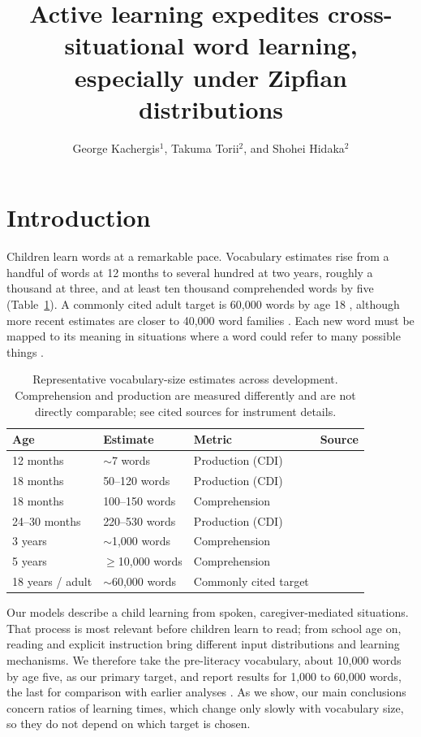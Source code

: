 \documentclass[a4paper,natbib,man]{apa6}
\title{Active learning expedites cross-situational word learning, especially under Zipfian distributions}
\author{George Kachergis$^1$, Takuma Torii$^2$, and Shohei Hidaka$^2$}
\affiliation{$^1$Department of Psychology, Stanford University, Stanford, CA, 94305, USA and $^2$School of Knowledge Science, Japan Advanced Institute of Science and Technology, Nomi, Ishikawa, 923-1292, Japan}
\begin{document}
\maketitle

\section{Introduction}

Children learn words at a remarkable pace. Vocabulary estimates rise from a handful of words at 12 months to several hundred at two years, roughly a thousand at three, and at least ten thousand comprehended words by five (Table~\ref{tab-vocab-benchmarks}). A commonly cited adult target is 60,000 words by age 18 \citep{Bloom:2000}, although more recent estimates are closer to 40,000 word families \citep{Brysbaert:2016}. Each new word must be mapped to its meaning in situations where a word could refer to many possible things \citep[cf.][]{Blythe:2016}.

\begin{table}[h]
\centering
\caption{\label{tab-vocab-benchmarks} Representative vocabulary-size estimates across development. Comprehension and production are measured differently and are not directly comparable; see cited sources for instrument details.}
\small
\begin{tabular}{@{}p{2.2cm}p{2.2cm}p{3.0cm}p{5.5cm}@{}}
\hline
Age & Estimate & Metric & Source \\
\hline
12 months & $\sim$7 words & Production (CDI) & \citep{Frank:2017} \\
18 months & 50--120 words & Production (CDI) & \citep{Frank:2017} \\
18 months & 100--150 words & Comprehension & \citep{Hulit:2002} \\
24--30 months & 220--530 words & Production (CDI) & \citep{Frank:2017} \\
3 years & $\sim$1,000 words & Comprehension & \citep{Hart:1995} \\
5 years & $\geq$10,000 words & Comprehension & \citep{Shipley:2015} \\
18 years / adult & $\sim$60,000 words & Commonly cited target & \citep{Bloom:2000} \\
\hline
\end{tabular}
\end{table}

Our models describe a child learning from spoken, caregiver-mediated situations. That process is most relevant before children learn to read; from school age on, reading and explicit instruction bring different input distributions and learning mechanisms. We therefore take the pre-literacy vocabulary, about 10,000 words by age five, as our primary target, and report results for 1,000 to 60,000 words, the last for comparison with earlier analyses \citep{Blythe:2010,Vogt:2012}. As we show, our main conclusions concern ratios of learning times, which change only slowly with vocabulary size, so they do not depend on which target is chosen.
\end{document}
